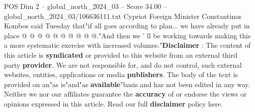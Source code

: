 \begin{textsample}{POS Dim 2 – global\_north\_2024\_03 – Score 34.00 – global\_north\_2024\_03/106636111.txt}
Cypriot Foreign Minister Constantinos Kombos said Tuesday that"if all goes according to plan... we have already put in place @ @ @ @ @ @ @ @ @ @."And then we ' ll be working towards making this a more systematic exercise with increased volumes."\textbf{Disclaimer} : The content of this article is \textbf{syndicated} or provided to this website from an external third party \textbf{provider}.
We are not responsible for, and do not control, such external websites, entities, applications or media \textbf{publishers}.
The body of the text is provided on an"as is"and"as \textbf{available}"basis and has not been edited in any way.
Neither we nor our affiliates guarantee the \textbf{accuracy} of or endorse the views or opinions expressed in this article.
Read our full \textbf{disclaimer} policy here.

\end{textsample}
